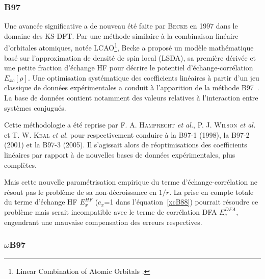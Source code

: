 	
	\subsubsection{B97}
	
	Une avancée significative a de nouveau été faite par \textsc{Becke} en 1997 dans le domaine des KS-DFT. Par une méthode similaire à la combinaison linéaire d'orbitales atomiques, notée LCAO\footnote{\og Linear Combination of Atomic Orbitals \fg{}.}, Becke a proposé un modèle mathématique basé sur l'approximation de densité de spin local (LSDA), sa première dérivée et une petite fraction d'échange HF pour décrire le potentiel d'échange-corrélation $E_{xc}[\rho]$. Une optimisation systématique des coefficients linéaires à partir d'un jeu classique de données expérimentales a conduit à l'apparition de la méthode B97~\cite{becke1997density}. La base de données contient notamment des valeurs relatives à l'interaction entre systèmes conjugués.
	
	Cette méthodologie a été reprise par F. A. \textsc{Hamprecht} \textit{et al.}, P. J. \textsc{Wilson} \textit{et al.} et T. W. \textsc{Keal} \textit{et al.} pour respectivement conduire à la B97-1 \cite{hamprecht1998development} (1998), la B97-2 \cite{wilson2001hybrid} (2001) et la B97-3 \cite{keal2005semiempirical} (2005). Il s'agissait alors de réoptimisations des coefficients linéaires par rapport à de nouvelles bases de données expérimentales, plus complètes.
	
	Mais cette nouvelle paramétrisation empirique du terme d'échange-corrélation ne résout pas le problème de sa non-décroissance en $1/r$. La prise en compte totale du terme d'échange HF $E_{x}^{HF}$ ($c_{x}$=1 dans l'équation~\ref{xcB88}) pourrait résoudre ce problème mais serait incompatible avec le terme de corrélation DFA $E_{c}^{DFA}$, engendrant une mauvaise compensation des erreurs respectives.
	
	\subsubsection{$\omega$B97}
	
